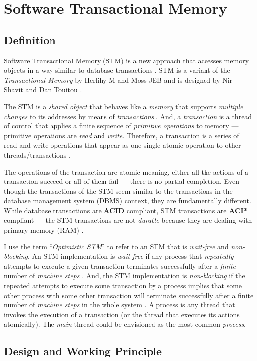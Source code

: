 \documentclass[../main]{subfiles}
\begin{document}
  \section{Software Transactional Memory}

  \subsection{Definition}

  \par
  Software Transactional Memory (STM) is a new approach that accesses memory objects in a way similar to database transactions \cite{weimerskirch2008software}. STM is a variant of the {\em Transactional Memory} by Herlihy M and Moss JEB and is designed by Nir Shavit and Dan Touitou \cite{weimerskirch2008software}\cite{Shavit1997}. \par

  The STM is a {\em shared object} that behaves like a {\em memory} that supports {\em multiple changes} to its addresses by means of {\em transactions} \cite{Shavit1997}. And, a {\em transaction} is a thread of control that applies a finite sequence of {\em primitive operations} to memory --- primitive operations are {\em read} and {\em write}. Therefore, a transaction is a series of read and write operations that appear as one single atomic operation to other threads/transactions \cite{weimerskirch2008software}. \par

  The operations of the transaction are atomic meaning, either all the actions of a transaction succeed or all of them fail --- there is no partial completion. Even though the transactions of the STM seem similar to the transactions in the database management system (DBMS) context, they are fundamentally different. While database transactions are {\bf ACID} compliant, STM transactions are {\bf ACI*} compliant --- the STM transactions are not {\em durable} because they are dealing with primary memory (RAM) \cite{weimerskirch2008software}. \par

  I use the term ``{\em Optimistic STM}'' to refer to an STM that is {\em wait-free} and {\em non-blocking}.
  An STM implementation is {\em wait-free} if any process that {\em repeatedly} attempts to execute a given transaction terminates successfully after a {\em finite} number of {\em machine steps} \cite{Shavit1997}. And, the STM implementation is {\em non-blocking} if the repeated attempts to execute some transaction by a process implies that some other process with some other transaction will terminate successfully after a finite number of {\em machine steps} in the whole system \cite{Shavit1997}. A process is any thread that invokes the execution of a transaction (or the thread that executes its actions atomically). The {\em main} thread could be envisioned as the most common {\em process}. \par

  \subsection{Design and Working Principle}

  \par
  
\end{document}
